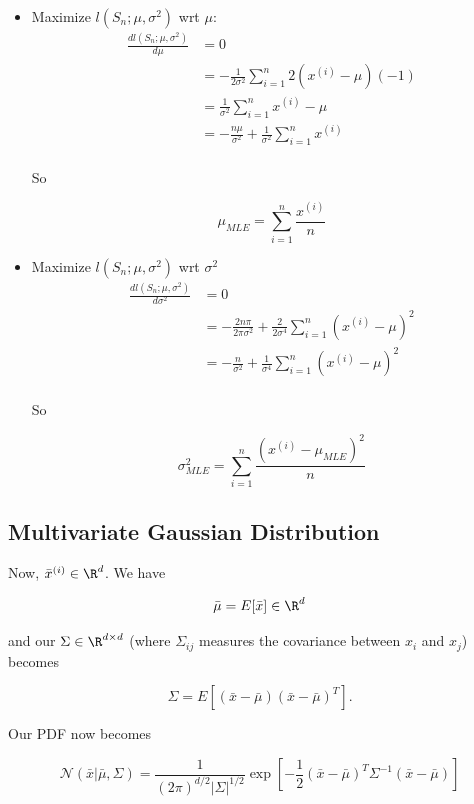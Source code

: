 \documentclass[12pt]{article}
\begin{document}
\begin{itemize}
	\item Maximize $l(S_n; \mu, \sigma^2)$ wrt $\mu$:
		\[ 
			\begin{aligned}
				\frac {dl(S_n; \mu, \sigma^2)}{d\mu} &= 0\\
																						 &= -\frac 1 {2 \sigma^2} \sum_{i=1}^n 2(x^{(i)} - \mu)(-1)\\
																						 &= \frac 1 {\sigma^2} \sum_{i=1}^n x^{(i)} - \mu\\
																						 &= -\frac {n \mu} {\sigma^2} + \frac 1 {\sigma^2} \sum_{i=1}^n x^{(i)}\\
			\end{aligned}
		\]

		So

		\[ \mu_{MLE} = \sum_{i=1}^n \frac {x^{(i)}} n \]

	\item Maximize $l(S_n; \mu, \sigma^2)$ wrt $\sigma^2$
		\[ 
			\begin{aligned}
				\frac {dl(S_n; \mu, \sigma^2)}{d\sigma^2} &= 0\\
																									&= -\frac {2n \pi} {2 \pi \sigma^2}  + \frac 2 {2 \sigma^4} \sum_{i=1}^n (x^{(i)} - \mu)^2\\
																									&= -\frac n {\sigma^2} + \frac 1 {\sigma^4} \sum_{i=1}^n (x^{(i)} - \mu)^2\\
			\end{aligned}
		\]

		So

		\[ \sigma_{MLE}^2 = \sum_{i=1}^n \frac {(x^{(i)} - \mu_{MLE})^2} n \]
\end{itemize}

\subsection{Multivariate Gaussian Distribution}

Now, $\bar x^{(i)} \in \R^d$. We have 

\[ \bar {\mu} = E[\bar x] \in \R^d \]

and our $\Sigma \in \R^{d \times d}$ (where $\Sigma_{ij}$ measures the covariance between $x_i$ and $x_j$) becomes

\[ \Sigma = E[(\bar x - \bar {\mu})(\bar x - \bar {\mu})^T]. \]

Our PDF now becomes

\[ \mathcal{N}(\bar x|\bar{\mu}, \Sigma) = \frac 1 {(2 \pi)^{d/2} |\Sigma|^{1/2}} \exp\left[ -\frac 1 2 (\bar x - \bar{\mu})^T \Sigma^{-1} (\bar x - \bar{\mu}) \right] \]
\end{document}
